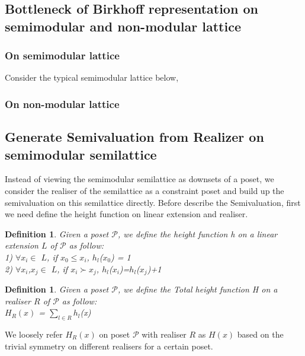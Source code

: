 \documentclass{article}
\newtheorem{definition}[theorem]{\bf Definition}
\begin{document}
\subsection{Bottleneck of Birkhoff representation on semimodular and non-modular lattice}
\subsubsection{On semimodular lattice}
Consider the typical semimodular lattice below, 
\subsubsection{On non-modular lattice}

\subsection{Generate Semivaluation from Realizer on semimodular semilattice}
Instead of viewing the semimodular semilattice as downsets of a poset, we consider the realiser of the semilattice as a constraint poset and build up the semivaluation on this semilattice directly. Before describe the Semivaluation, first we need define the height function on linear extension and realiser.

\begin{definition}
Given a poset $\mathcal{P}$, we define the height function h on a linear extension $L$ of  $\mathcal{P}$ as follow:\\

1) $\forall$$x_{i}$$\in$ $L$,  if $x_{0}$$\leq$$x_{i}$, $h_{l}$($x_{0}$) = 1\\

2) $\forall$$x_{i}$,$x_{j}$$\in$ $L$, if $x_{i}$$\succ$$x_{j}$, $h_{l}$($x_{i}$)=$h_{l}$($x_{j}$)+1  

\end{definition}

\begin{definition}
Given a poset $\mathcal{P}$, we define the Total height function H on a realiser $R$ of $\mathcal{P}$ as follow:\\ 

$H_{R}(x)$ = $\sum_{l\in R}$$h_{l}$(x)

\end{definition}

 We loosely refer $H_{R}(x)$ on poset $\mathcal{P}$ with realiser $R$ as $H(x)$ based on the trivial symmetry on different realisers for a certain poset.\\\\
\end{document}
